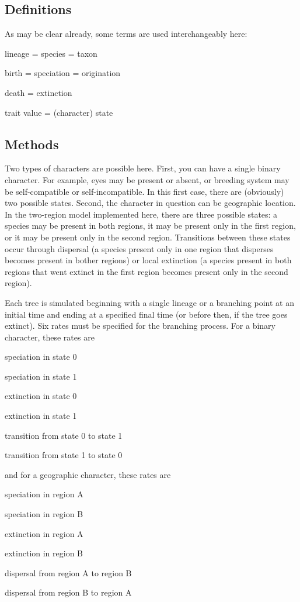 \documentclass[10pt]{article}
\begin{document}
\subsection*{Definitions}

As may be clear already, some terms are used interchangeably here:
\begin{tightlist}
\item lineage = species = taxon
\item birth = speciation = origination
\item death = extinction
\item trait value = (character) state
\end{tightlist}

\subsection*{Methods}

Two types of characters are possible here.  First, you can have a single binary character.  For example, eyes may be present or absent, or breeding system may be self-compatible or self-incompatible.  In this first case, there are (obviously) two possible states.
Second, the character in question can be geographic location.  In the two-region model implemented here, there are three possible states: a species may be present in both regions, it may be present only in the first region, or it may be present only in the second region.  Transitions between these states occur through dispersal (a species present only in one region that disperses becomes present in bother regions) or local extinction (a species present in both regions that went extinct in the first region becomes present only in the second region).

Each tree is simulated beginning with a single lineage or a branching point at an initial time and ending at a specified final time (or before then, if the tree goes extinct).  Six rates must be specified for the branching process.  For a binary character, these rates are
\begin{tightlist}
\item speciation in state 0
\item speciation in state 1
\item extinction in state 0
\item extinction in state 1
\item transition from state 0 to state 1
\item transition from state 1 to state 0
\end{tightlist}
and for a geographic character, these rates are
\begin{tightlist}
\item speciation in region A
\item speciation in region B
\item extinction in region A
\item extinction in region B
\item dispersal from region A to region B
\item dispersal from region B to region A
\end{tightlist}
\end{document}
